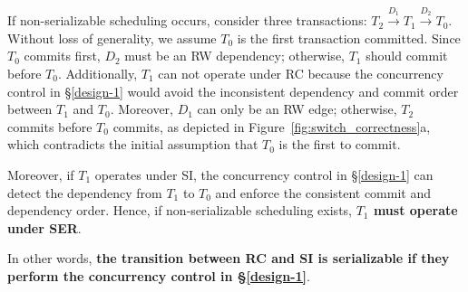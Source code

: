 {
If non-serializable scheduling occurs, consider three transactions: $T_2 \xrightarrow{D_1} T_1 \xrightarrow{D_2} T_0$. 
Without loss of generality, we assume $T_0$ is the first transaction committed.
Since $T_0$ commits first, $D_2$ must be an RW dependency; otherwise, $T_1$ should commit before $T_0$. 
Additionally, $T_1$ can not operate under RC because the concurrency control in \S\ref{design-1} would avoid the inconsistent dependency and commit order between $T_1$ and $T_0$. 
Moreover, $D_1$ can only be an RW edge; otherwise, $T_2$ commits before $T_0$ commits, as depicted in Figure~\ref{fig:switch_correctness}a, which contradicts the initial assumption that $T_0$ is the first to commit. 

Moreover, if $T_1$ operates under SI, the concurrency control in \S\ref{design-1} can detect the dependency from $T_1$ to $T_0$ and
enforce the consistent commit and dependency order. 
Hence, if non-serializable scheduling exists, \textbf{$T_1$ must operate under SER}. 

In other words, \textbf{the transition between RC and SI is serializable if they perform the concurrency control in \S\ref{design-1}}. 




}
